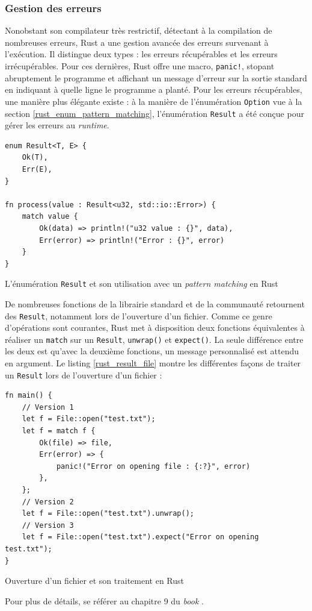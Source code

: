 \documentclass[a4paper, 12pt]{article}
\newenvironment{code}{\captionsetup{type=listing}}{}
\begin{document}
\subsubsection{Gestion des erreurs} 
Nonobstant son compilateur très restrictif, détectant à la compilation de nombreuses erreurs, Rust 
a une gestion avancée des erreurs survenant à l'exécution. Il distingue deux types : les erreurs 
récupérables et les erreurs irrécupérables. Pour ces dernières, Rust offre une macro, 
\texttt{panic!}, stopant abruptement le programme et affichant un message d'erreur sur 
la sortie standard en indiquant à quelle ligne le programme a planté. Pour les erreurs récupérables, 
une manière plus élégante existe : à la manière de l'énumération \texttt{Option} vue à 
la section \ref{rust_enum_pattern_matching}, l'énumération \texttt{Result} a été conçue 
pour gérer les erreurs au \textit{runtime}.
\bigbreak
\begin{code}
    \begin{verbatim}
enum Result<T, E> {
    Ok(T),
    Err(E),
}

fn process(value : Result<u32, std::io::Error>) {
    match value {
        Ok(data) => println!("u32 value : {}", data),
        Err(error) => println!("Error : {}", error)
    }
}
    \end{verbatim}
    \caption{L'énumération \texttt{Result} et son utilisation avec un \textit{pattern matching} en Rust}
    \label{rust_result}
\end{code}
\bigbreak
De nombreuses fonctions de la librairie standard et de la communauté retournent des 
\texttt{Result}, notamment lors de l'ouverture d'un fichier. Comme ce genre d'opérations 
sont courantes, Rust met à disposition deux fonctions équivalentes à réaliser un \texttt{match} 
sur un \texttt{Result}, \texttt{unwrap()} et \texttt{expect()}. La 
seule différence entre les deux est qu'avec la deuxième fonctions, un message personnalisé est 
attendu en argument. Le listing \ref{rust_result_file} montre les différentes façons de traiter un 
\texttt{Result} lors de l'ouverture d'un fichier :
\bigbreak
\begin{code}
    \begin{verbatim}
fn main() {
    // Version 1
    let f = File::open("test.txt");
    let f = match f {
        Ok(file) => file,
        Err(error) => {
            panic!("Error on opening file : {:?}", error)
        },
    };
    // Version 2
    let f = File::open("test.txt").unwrap();
    // Version 3
    let f = File::open("test.txt").expect("Error on opening test.txt");
}
    \end{verbatim}
    \caption{Ouverture d'un fichier et son traitement en Rust}
    \label{rust_result_file}
\end{code}
\bigbreak
Pour plus de détails, se référer au chapitre 9 du \textit{book} \cite{ref0}.
\end{document}
